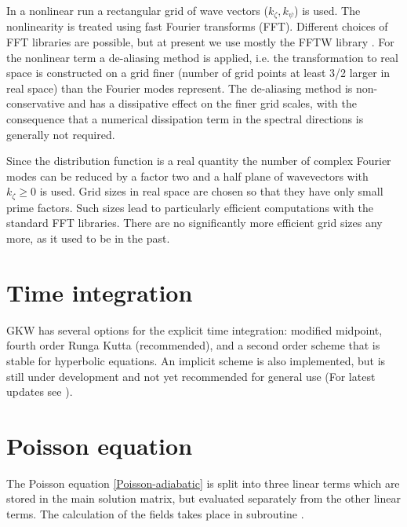 In a nonlinear run a rectangular grid of wave vectors ($k_\zeta,k_\psi$) is used. 
The nonlinearity is treated using fast Fourier transforms (FFT).
Different choices of FFT libraries are possible, but at present we use mostly the FFTW library \cite{FFT05}. 
For the nonlinear term a de-aliasing method is applied, i.e. the transformation to real space is constructed on a grid finer 
(number of grid points at least 3/2 larger in real space) than the Fourier modes represent. 
The de-aliasing method is non-conservative and has a dissipative effect on the finer grid scales, with the consequence that a 
numerical dissipation term in the spectral directions is generally not required.

Since the distribution function is a real quantity the number of
complex Fourier modes can be reduced by a factor two and a half plane
of wavevectors with $k_\zeta \ge 0$ is used.  Grid sizes in real space
are chosen so that they have only small prime factors. Such sizes lead
to particularly efficient computations with the standard FFT
libraries. There are no significantly more efficient grid sizes any
more, as it used to be in the past.

\section{Time integration}

GKW has several options for the explicit time integration: modified midpoint, fourth order Runga Kutta (recommended), 
and a second order scheme that is stable for hyperbolic equations. An implicit scheme is also implemented, but is still under development
and not yet recommended for general use (For latest updates see ). 

\section{Poisson equation \label{Poisson-detail}}

The Poisson equation \ref{Poisson-adiabatic} is split into three linear terms which are stored in 
the main solution matrix,  but evaluated separately from the other linear terms. 
The calculation of the fields takes place in  subroutine .


